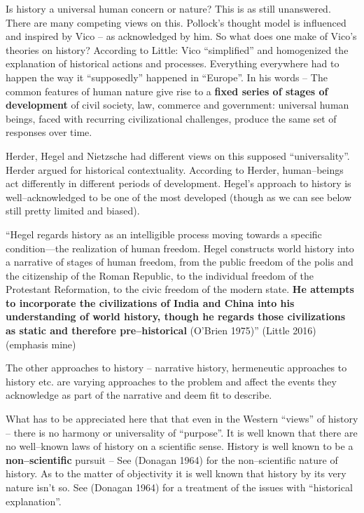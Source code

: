 Is history a universal human concern or nature? This is as still unanswered. There are many competing views on this. Pollock’s thought model is influenced and inspired by Vico – as acknowledged by him. So what does one make of Vico’s theories on history? According to Little: Vico “simplified” and homogenized the explanation of historical actions and processes. Everything everywhere had to happen the way it “supposedly” happened in “Europe”. In his words – The common features of human nature give rise to a \textbf{fixed series of stages of development} of civil society, law, commerce and government: universal human beings, faced with recurring civilizational challenges, produce the same set of responses over time.

Herder, Hegel and Nietzsche had different views on this supposed “universality”. Herder argued for historical contextuality. According to Herder, human–beings act differently in different periods of development. Hegel's approach to history is well–acknowledged to be one of the most developed (though as we can see below still pretty limited and biased).

\begin{myquote}
“Hegel regards history as an intelligible process moving towards a specific condition—the realization of human freedom. Hegel constructs world history into a narrative of stages of human freedom, from the public freedom of the polis and the citizenship of the Roman Republic, to the individual freedom of the Protestant Reformation, to the civic freedom of the modern state. \textbf{He attempts to incorporate the civilizations of India and China into his understanding of world history, though he regards those civilizations as static and therefore pre–historical} \hfill (O'Brien 1975)” (Little 2016) (emphasis mine)
\end{myquote}

The other approaches to history – narrative history, hermeneutic approaches to history etc. are varying approaches to the problem and affect the events they acknowledge as part of the narrative and deem fit to describe.

What has to be appreciated here that that even in the Western “views” of history – there is no harmony or universality of “purpose”. It is well known that there are no well–known laws of history on a scientific sense. History is well known to be a \textbf{non–scientific} pursuit – See (Donagan 1964) for the non–scientific nature of history. As to the matter of objectivity it is well known that history by its very nature isn’t so. See (Donagan 1964) for a treatment of the issues with “historical explanation”.

